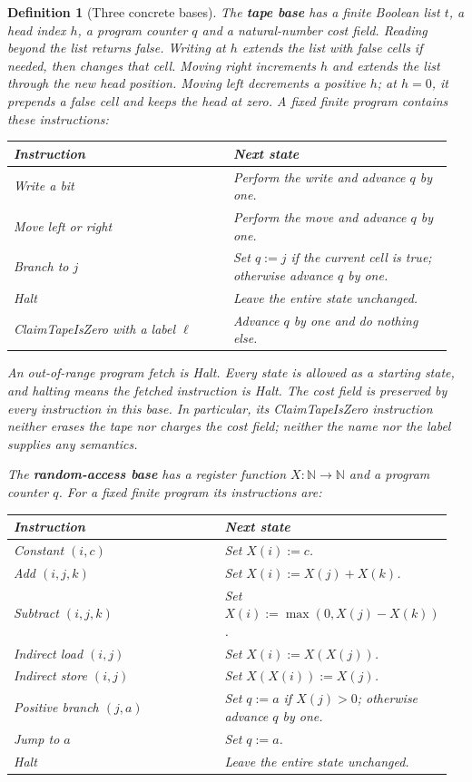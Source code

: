 \documentclass[11pt,twoside]{article}
\theoremstyle{thielethm}
\theoremstyle{thieledef}
\newtheorem{definition}{Definition}[section]
\theoremstyle{thieledef}
\theoremstyle{thieledef}
\theoremstyle{thielethm}
\theoremstyle{thieleobs}
\theoremstyle{thielethm}
\begin{document}
\begin{definition}[Three concrete bases]\label{def:u11-concrete-bases}
The \textbf{tape base} has a finite Boolean list $t$, a head index $h$, a program counter
$q$ and a natural-number cost field. Reading beyond the list returns false. Writing
at $h$ extends the list with false cells if needed, then changes that cell.
Moving right increments $h$ and extends the list through the new head position.
Moving left decrements a positive $h$; at $h=0$, it prepends a false cell and keeps
the head at zero. A fixed finite program contains these instructions:

\begingroup\small
\begin{longtable}{@{}>{\raggedright\arraybackslash}p{0.482\linewidth}>{\raggedright\arraybackslash}p{0.482\linewidth}@{}}
\toprule
\textbf{Instruction} & \textbf{Next state} \\
\midrule
\endhead
\bottomrule
\endlastfoot
Write a bit & Perform the write and advance $q$ by one. \\
Move left or right & Perform the move and advance $q$ by one. \\
Branch to $j$ & Set $q:=j$ if the current cell is true; otherwise advance $q$ by one. \\
Halt & Leave the entire state unchanged. \\
ClaimTapeIsZero with a label $\ell$ & Advance $q$ by one and do nothing else. \\
\end{longtable}
\endgroup

An out-of-range program fetch is Halt. Every state is allowed as a starting state,
and halting means the fetched instruction is Halt. The cost field is preserved by
every instruction in this base. In particular, its ClaimTapeIsZero instruction
neither erases the tape nor charges the cost field; neither the name nor the label supplies any
semantics.

The \textbf{random-access base} has a register function $X:\mathbb N\to\mathbb N$ and a
program counter $q$. For a fixed finite program its instructions are:

\begingroup\small
\begin{longtable}{@{}>{\raggedright\arraybackslash}p{0.482\linewidth}>{\raggedright\arraybackslash}p{0.482\linewidth}@{}}
\toprule
\textbf{Instruction} & \textbf{Next state} \\
\midrule
\endhead
\bottomrule
\endlastfoot
Constant $(i,c)$ & Set $X(i):=c$. \\
Add $(i,j,k)$ & Set $X(i):=X(j)+X(k)$. \\
Subtract $(i,j,k)$ & Set $X(i):=\max(0,X(j)-X(k))$. \\
Indirect load $(i,j)$ & Set $X(i):=X(X(j))$. \\
Indirect store $(i,j)$ & Set $X(X(i)):=X(j)$. \\
Positive branch $(j,a)$ & Set $q:=a$ if $X(j)>0$; otherwise advance $q$ by one. \\
Jump to $a$ & Set $q:=a$. \\
Halt & Leave the entire state unchanged. \\
\end{longtable}
\endgroup


\end{definition}
\end{document}
